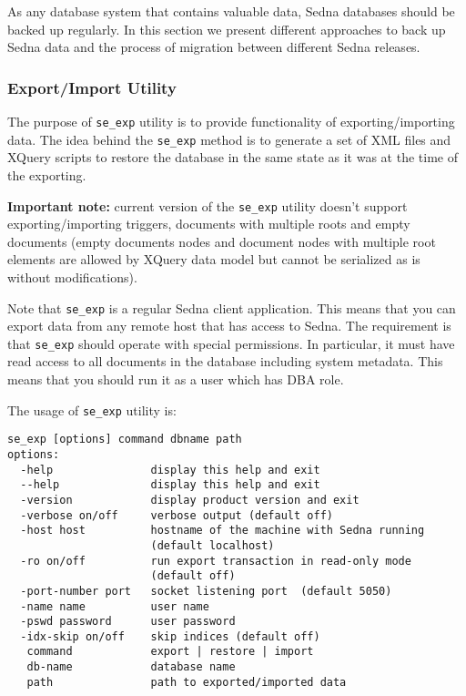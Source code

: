\documentclass[a4paper,12pt]{article}
\begin{document}
As any database system that contains valuable data, Sedna databases should be
backed up regularly. In this section we present different approaches to back up
Sedna data and the process of migration between different Sedna releases.

\subsubsection{Export/Import Utility}

The purpose of \verb!se_exp! utility is to provide functionality of
exporting/importing data. The idea behind the \verb!se_exp! method is to
generate a set of XML files and XQuery scripts to restore the database in the
same state as it was at the time of the exporting.

\textbf{Important note:} current version of the \verb!se_exp! utility doesn't
support exporting/importing triggers, documents with multiple roots and empty
documents (empty documents nodes and document nodes with multiple root elements
are allowed by XQuery data model but cannot be serialized as is without
modifications).

Note that \verb!se_exp! is a regular Sedna client application. This means that
you can export data from any remote host that has access to Sedna. The
requirement is that \verb!se_exp! should operate with special permissions. In
particular, it must have read access to all documents in the database including
system metadata. This means that you should run it as a user which has DBA role.

The usage of \verb!se_exp! utility is:

\small{
\begin{verbatim}
se_exp [options] command dbname path
options:
  -help               display this help and exit
  --help              display this help and exit
  -version            display product version and exit
  -verbose on/off     verbose output (default off)
  -host host          hostname of the machine with Sedna running
                      (default localhost)
  -ro on/off          run export transaction in read-only mode
                      (default off)
  -port-number port   socket listening port  (default 5050)
  -name name          user name
  -pswd password      user password
  -idx-skip on/off    skip indices (default off)
   command            export | restore | import
   db-name            database name
   path               path to exported/imported data
\end{verbatim}}
\end{document}
